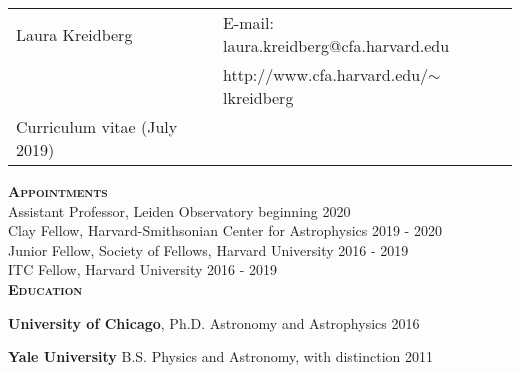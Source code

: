 \documentclass[12pt,letterpaper]{article}
\def\name{Laura R. Kreidberg}
\renewenvironment{itemize}{
	\begin{list}{}{
	\setlength{\leftmargin}{1mm}%
	\setlength{\itemsep}{0pt}%
	\setlength{\parskip}{0pt}
	}
}{
	\end{list}
}
\begin{document}
\sloppy



\vspace{3 mm}

\begin{tabular}{@{}p{4.0in}@{}p{5.0in}}
    \LARGE{Laura Kreidberg}                  & E-mail: laura.kreidberg@cfa.harvard.edu\\  
    \,                                       & http://www.cfa.harvard.edu/$\sim$lkreidberg \\ 
    \large{Curriculum vitae} (July 2019) & \, \\
\end{tabular}
\vspace{8mm}

\textbf{\textsc{Appointments}}\\
Assistant Professor, Leiden Observatory \hfill beginning 2020\\
Clay Fellow, Harvard-Smithsonian Center for Astrophysics \hfill 2019 - 2020\\
Junior Fellow, Society of Fellows, Harvard University \hfill 2016 - 2019\\
ITC Fellow, Harvard University \hfill 2016 - 2019\\

\textbf{\textsc{Education}}
\vspace{-2mm}
\begin{itemize}
    \item \textbf{University of Chicago}, Ph.D. Astronomy and Astrophysics \hfill 2016
    \item \textbf{Yale University} B.S. Physics and Astronomy, with distinction \hfill 2011
\end{itemize}
\end{document}

